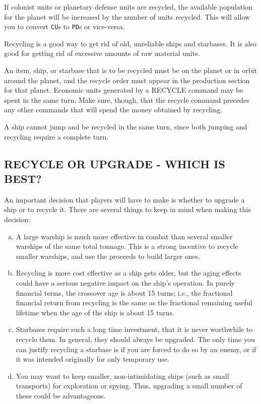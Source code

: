\documentclass[10pt,titlepage]{article}
\begin{document}
If colonist units or planetary defense units are recycled, the available
population for the planet will be increased by the number of units recycled.
This will allow you to convert \texttt{CU}s to \texttt{PD}s or vice-versa.

Recycling is a good way to get rid of old, unreliable ships and starbases.  It
is also good for getting rid of excessive amounts of raw material units.

An item, ship, or starbase that is to be recycled must be on the planet or in
orbit around the planet, and the recycle order must appear in the production
section for that planet.  Economic units generated by a RECYCLE command may be
spent in the same turn.  Make sure, though, that the recycle command precedes
any other commands that will spend the money obtained by recycling.

A ship cannot jump and be recycled in the same turn, since both jumping and
recycling require a complete turn.


\subsection{RECYCLE OR UPGRADE - WHICH IS BEST?}
\label{sec:recycleorupgrade}


An important decision that players will have to make is whether to upgrade a
ship or to recycle it.  There are several things to keep in mind when making
this decision:

\begin{enumerate}[a.]
\item A large warship is much more effective in combat than several
	smaller warships of the same total tonnage.  This is a strong
	incentive to recycle smaller warships, and use the proceeds to
	build larger ones.

\item Recycling is more cost effective as a ship gets older, but
	the aging effects could have a serious negative impact on the
	ship's operation.  In purely financial terms, the crossover age
	is about 15 turns; i.e., the fractional financial return from
	recycling is the same as the fractional remaining useful lifetime
	when the age of the ship is about 15 turns.

\item Starbases require such a long time investment, that it is
	never worthwhile to recycle them.  In general, they should always
	be upgraded.  The only time you can justify recycling a starbase
	is if you are forced to do so by an enemy, or if it was intended
	originally for only temporary use.

\item You may want to keep smaller, non-intimidating ships (such as
	small transports) for exploration or spying.  Thus, upgrading a
	small number of these could be advantageous.
\end{enumerate}
\end{document}
